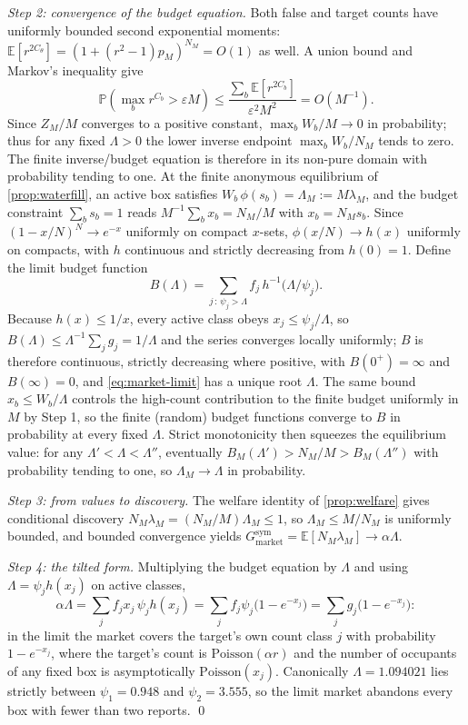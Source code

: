 \documentclass[11pt]{article}
\theoremstyle{definition}
\theoremstyle{remark}
\newcommand{\E}{\mathbb{E}}
\newcommand{\Prob}{\mathbb{P}}
\newcommand{\1}{\mathbf{1}}
\newcommand{\mkt}{\mathrm{market}}
\begin{document}
\emph{Step 2: convergence of the budget equation.} Both false and target counts have uniformly bounded second exponential moments: $\E[r^{2C_\theta}]=(1+(r^2-1)p_M)^{N_M}=O(1)$ as well. A union bound and Markov's inequality give
\[
\Prob\left(\max_b r^{C_b}>\varepsilon M\right)
\le \frac{\sum_b\E[r^{2C_b}]}{\varepsilon^2M^2}=O(M^{-1}).
\]
Since $Z_M/M$ converges to a positive constant, $\max_b W_b/M\to0$ in probability; thus for any fixed $\Lambda>0$ the lower inverse endpoint $\max_b W_b/N_M$ tends to zero. The finite inverse/budget equation is therefore in its non-pure domain with probability tending to one. At the finite anonymous equilibrium of \cref{prop:waterfill}, an active box satisfies $W_b\,\phi(s_b)=\Lambda_M:=M\lambda_M$, and the budget constraint $\sum_b s_b=1$ reads $M^{-1}\sum_b x_b=N_M/M$ with $x_b=N_Ms_b$. Since $(1-x/N)^N\to e^{-x}$ uniformly on compact $x$-sets, $\phi(x/N)\to h(x)$ uniformly on compacts, with $h$ continuous and strictly decreasing from $h(0)=1$. Define the limit budget function
\[
B(\Lambda)=\sum_{j\,:\,\psi_j>\Lambda} f_j\,h^{-1}\!\bigl(\Lambda/\psi_j\bigr).
\]
Because $h(x)\le 1/x$, every active class obeys $x_j\le\psi_j/\Lambda$, so $B(\Lambda)\le\Lambda^{-1}\sum_jg_j=1/\Lambda$ and the series converges locally uniformly; $B$ is therefore continuous, strictly decreasing where positive, with $B(0^+)=\infty$ and $B(\infty)=0$, and \cref{eq:market-limit} has a unique root $\Lambda$. The same bound $x_b\le W_b/\Lambda$ controls the high-count contribution to the finite budget uniformly in $M$ by Step 1, so the finite (random) budget functions converge to $B$ in probability at every fixed $\Lambda$. Strict monotonicity then squeezes the equilibrium value: for any $\Lambda'<\Lambda<\Lambda''$, eventually $B_M(\Lambda')>N_M/M>B_M(\Lambda'')$ with probability tending to one, so $\Lambda_M\to\Lambda$ in probability.

\emph{Step 3: from values to discovery.} The welfare identity of \cref{prop:welfare} gives conditional discovery $N_M\lambda_M=(N_M/M)\Lambda_M\le1$, so $\Lambda_M\le M/N_M$ is uniformly bounded, and bounded convergence yields $G_{\mkt}^{\mathrm{sym}}=\E[N_M\lambda_M]\to\alpha\Lambda$.

\emph{Step 4: the tilted form.} Multiplying the budget equation by $\Lambda$ and using $\Lambda=\psi_jh(x_j)$ on active classes,
\[
\alpha\Lambda
=\sum_j f_jx_j\,\psi_jh(x_j)
=\sum_j f_j\psi_j\bigl(1-e^{-x_j}\bigr)
=\sum_j g_j\bigl(1-e^{-x_j}\bigr):
\]
in the limit the market covers the target's own count class $j$ with probability $1-e^{-x_j}$, where the target's count is $\mathrm{Poisson}(\alpha r)$ and the number of occupants of any fixed box is asymptotically $\mathrm{Poisson}(x_j)$. Canonically $\Lambda=1.094021$ lies strictly between $\psi_1=0.948$ and $\psi_2=3.555$, so the limit market abandons every box with fewer than two reports. \qed
\end{document}
